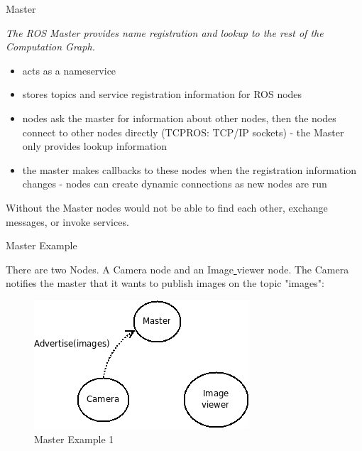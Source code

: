 \documentclass{beamer}
\begin{document}
\begin{frame}{Master}
	\begin{definition}[Master]
		\textit{The ROS Master provides name registration and lookup to the rest of the Computation Graph.}
	\end{definition}
	
	\begin{itemize}
		\item acts as a nameservice 
		\item stores topics and service registration information for ROS nodes
		\item nodes ask the master for information about other nodes, then the nodes connect to other nodes directly (TCPROS: TCP/IP sockets) -  the Master only provides lookup information
		\item the master makes callbacks to these nodes when the registration information changes -  nodes can create dynamic connections as new nodes are run
		
	\end{itemize}
	Without the Master nodes would not be able to find each other, exchange messages, or invoke services.
	
\end{frame}

\begin{frame}{Master Example}
	
	There are two Nodes. A Camera node and an Image\underline{ }viewer node. The Camera notifies the master that it wants to publish images on the topic "images":
	 
		  \begin{figure}[H]
		  	\centering
		  	\includegraphics[scale=0.7]{ROS_master_example_english_1.png}
		  	\caption{Master Example 1}
		  	\label{fig:ros_master_example_1}
		  \end{figure}
	
	
\end{frame}
\end{document}
